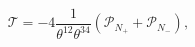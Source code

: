 \begin{equation}
 \mathcal{T}=-4\frac{1}{\theta^{12}\theta^{34}}(\mathcal{P}_{N_+}+
 \mathcal{P}_{N_-}),
\end{equation}

